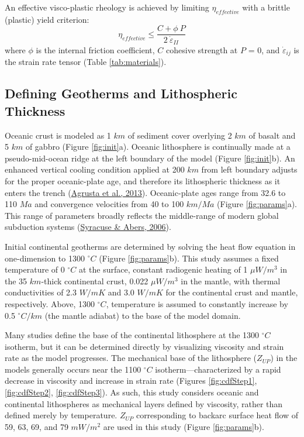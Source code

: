 \noindent An effective visco-plastic rheology is achieved by limiting \(\eta_{effective}\) with a brittle (plastic) yield criterion:
\begin{equation}
  \eta_{effective} \leq \frac{C + \phi \ P}{2 \ \dot{\varepsilon}_{II}}
  \label{eq:plastic}
\end{equation}
where \(\phi\) is the internal friction coefficient, \(C\) cohesive strength at \(P\) = 0, and \({\dot{\varepsilon}}_{ij}\) is the strain rate tensor (Table \ref{tab:materials}).

\hypertarget{numGeotherms}{%
\subsection{Defining Geotherms and Lithospheric Thickness}\label{numGeotherms}}

Oceanic crust is modeled as 1 \(km\) of sediment cover overlying 2 \(km\) of basalt and 5 \(km\) of gabbro (Figure \ref{fig:init}a). Oceanic lithosphere is continually made at a pseudo-mid-ocean ridge at the left boundary of the model (Figure \ref{fig:init}b). An enhanced vertical cooling condition applied at 200 \(km\) from left boundary adjusts for the proper oceanic-plate age, and therefore its lithospheric thickness as it enters the trench (\protect\hyperlink{ref-agrusta2013}{Agrusta et al., 2013}). Oceanic-plate ages range from 32.6 to 110 \(Ma\) and convergence velocities from 40 to 100 \(km/Ma\) (Figure \ref{fig:params}a). This range of parameters broadly reflects the middle-range of modern global subduction systems (\protect\hyperlink{ref-syracuse2006}{Syracuse \& Abers, 2006}).

Initial continental geotherms are determined by solving the heat flow equation in one-dimension to 1300 \(^{\circ}C\) (Figure \ref{fig:params}b). This study assumes a fixed temperature of 0 \(^{\circ}C\) at the surface, constant radiogenic heating of 1 \(\mu W/m^{3}\) in the 35 \(km\)-thick continental crust, 0.022 \(\mu W/m^{3}\) in the mantle, with thermal conductivities of 2.3 \(W/mK\) and 3.0 \(W/mK\) for the continental crust and mantle, respectively. Above, 1300 \(^{\circ}C\), temperature is assumed to constantly increase by 0.5 \(^{\circ}C/km\) (the mantle adiabat) to the base of the model domain.

Many studies define the base of the continental lithosphere at the 1300 \(^{\circ}C\) isotherm, but it can be determined directly by visualizing viscosity and strain rate as the model progresses. The mechanical base of the lithosphere (\(Z_{UP}\)) in the models generally occurs near the 1100 \(^{\circ}C\) isotherm---characterized by a rapid decrease in viscosity and increase in strain rate (Figures \ref{fig:cdfStep1}, \ref{fig:cdfStep2}, \ref{fig:cdfStep3}). As such, this study considers oceanic and continental lithospheres as mechanical layers defined by viscosity, rather than defined merely by temperature. \(Z_{UP}\) corresponding to backarc surface heat flow of 59, 63, 69, and 79 \(mW/m^{2}\) are used in this study (Figure \ref{fig:params}b).

